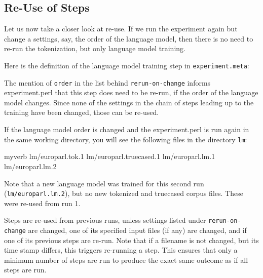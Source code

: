 \documentclass{pbml}
\begin{document}
\subsection{Re-Use of Steps}

Let us now take a closer look at re-use. If we run the experiment again but change a settings, say, the order of the language model, then there is no need to re-run the tokenization, but only language model training.

Here is the definition of the language model training step in {\tt experiment.meta}:

\vspace{2mm}
\colorbox{gray}{%
}
\vspace{2mm}

The mention of {\tt order} in the list behind {\tt rerun-on-change} informs experiment.perl that this step does need to be re-run, if the order of the language model changes. Since none of the settings in the chain of steps leading up to the training have been changed, those can be re-used.

If the language model order is changed and the experiment.perl is run again in the same working directory, you will see the following files in the directory {\tt lm}:

\vspace{2mm}
\begin{SaveVerbatim}{myverb}
 lm/europarl.tok.1
 lm/europarl.truecased.1
 lm/europarl.lm.1
 lm/europarl.lm.2
\end{SaveVerbatim}
\colorbox{gray}{%
}
\vspace{2mm}

Note that a new language model was trained for this second run ({\tt lm/europarl.lm.2}), but no new tokenized and truecased corpus files. These were re-used from run 1.

Steps are re-used from previous runs, unless settings listed under {\tt rerun-on\--change} are changed, one of its specified input files (if any) are changed, and if one of its previous steps are re-run. Note that if a filename is not changed, but its time stamp differs, this triggers re-running a step. This ensures that only a minimum number of steps are run to produce the exact same outcome as if all steps are run.
\end{document}
